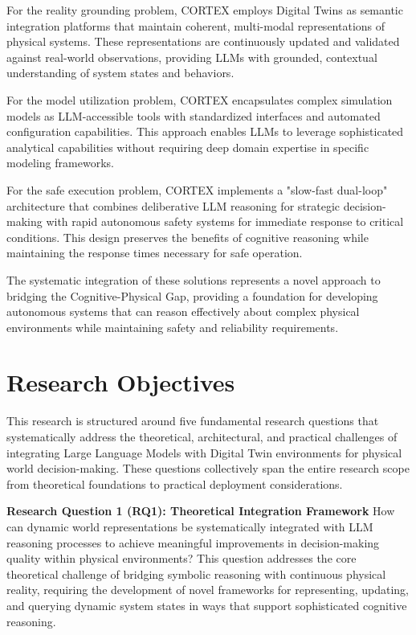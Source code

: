For the reality grounding problem, CORTEX employs Digital Twins as semantic integration platforms that maintain coherent, multi-modal representations of physical systems. These representations are continuously updated and validated against real-world observations, providing LLMs with grounded, contextual understanding of system states and behaviors.

For the model utilization problem, CORTEX encapsulates complex simulation models as LLM-accessible tools with standardized interfaces and automated configuration capabilities. This approach enables LLMs to leverage sophisticated analytical capabilities without requiring deep domain expertise in specific modeling frameworks.

For the safe execution problem, CORTEX implements a "slow-fast dual-loop" architecture that combines deliberative LLM reasoning for strategic decision-making with rapid autonomous safety systems for immediate response to critical conditions. This design preserves the benefits of cognitive reasoning while maintaining the response times necessary for safe operation.

The systematic integration of these solutions represents a novel approach to bridging the Cognitive-Physical Gap, providing a foundation for developing autonomous systems that can reason effectively about complex physical environments while maintaining safety and reliability requirements.

\section{Research Objectives}

This research is structured around five fundamental research questions that systematically address the theoretical, architectural, and practical challenges of integrating Large Language Models with Digital Twin environments for physical world decision-making. These questions collectively span the entire research scope from theoretical foundations to practical deployment considerations.

\textbf{Research Question 1 (RQ1): Theoretical Integration Framework}
How can dynamic world representations be systematically integrated with LLM reasoning processes to achieve meaningful improvements in decision-making quality within physical environments? This question addresses the core theoretical challenge of bridging symbolic reasoning with continuous physical reality, requiring the development of novel frameworks for representing, updating, and querying dynamic system states in ways that support sophisticated cognitive reasoning.


